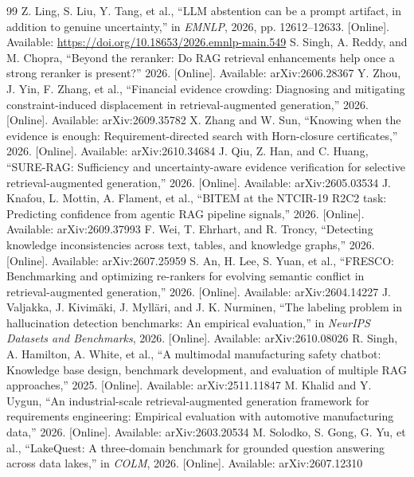 \documentclass[preprint,3p,times]{elsarticle}
\begin{document}
\begin{thebibliography}{99}
 Z. Ling, S. Liu, Y. Tang, et al., ``LLM abstention can be a prompt artifact, in addition to genuine uncertainty,'' in \emph{EMNLP}, 2026, pp. 12612--12633. [Online]. Available: \url{https://doi.org/10.18653/2026.emnlp-main.549}
 S. Singh, A. Reddy, and M. Chopra, ``Beyond the reranker: Do RAG retrieval enhancements help once a strong reranker is present?'' 2026. [Online]. Available: arXiv:2606.28367
 Y. Zhou, J. Yin, F. Zhang, et al., ``Financial evidence crowding: Diagnosing and mitigating constraint-induced displacement in retrieval-augmented generation,'' 2026. [Online]. Available: arXiv:2609.35782
 X. Zhang and W. Sun, ``Knowing when the evidence is enough: Requirement-directed search with Horn-closure certificates,'' 2026. [Online]. Available: arXiv:2610.34684
 J. Qiu, Z. Han, and C. Huang, ``SURE-RAG: Sufficiency and uncertainty-aware evidence verification for selective retrieval-augmented generation,'' 2026. [Online]. Available: arXiv:2605.03534
 J. Knafou, L. Mottin, A. Flament, et al., ``BITEM at the NTCIR-19 R2C2 task: Predicting confidence from agentic RAG pipeline signals,'' 2026. [Online]. Available: arXiv:2609.37993
 F. Wei, T. Ehrhart, and R. Troncy, ``Detecting knowledge inconsistencies across text, tables, and knowledge graphs,'' 2026. [Online]. Available: arXiv:2607.25959
 S. An, H. Lee, S. Yuan, et al., ``FRESCO: Benchmarking and optimizing re-rankers for evolving semantic conflict in retrieval-augmented generation,'' 2026. [Online]. Available: arXiv:2604.14227
 J. Valjakka, J. Kivim\"aki, J. Myll\"ari, and J. K. Nurminen, ``The labeling problem in hallucination detection benchmarks: An empirical evaluation,'' in \emph{NeurIPS Datasets and Benchmarks}, 2026. [Online]. Available: arXiv:2610.08026
 R. Singh, A. Hamilton, A. White, et al., ``A multimodal manufacturing safety chatbot: Knowledge base design, benchmark development, and evaluation of multiple RAG approaches,'' 2025. [Online]. Available: arXiv:2511.11847
 M. Khalid and Y. Uygun, ``An industrial-scale retrieval-augmented generation framework for requirements engineering: Empirical evaluation with automotive manufacturing data,'' 2026. [Online]. Available: arXiv:2603.20534
 M. Solodko, S. Gong, G. Yu, et al., ``LakeQuest: A three-domain benchmark for grounded question answering across data lakes,'' in \emph{COLM}, 2026. [Online]. Available: arXiv:2607.12310

\end{thebibliography}
\end{document}
